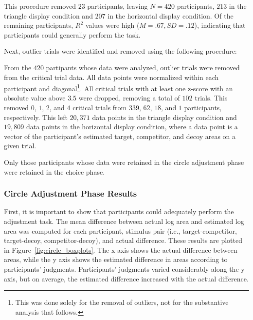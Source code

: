 This procedure removed $23$ participants, leaving $N=420$ participants, $213$ in the triangle display condition and $207$ in the horizontal display condition. Of the remaining participants, $R^2$ values were high ($M=.67,SD=.12$), indicating that participants could generally perform the task.

Next, outlier trials were identified and removed using the following procedure:

From the $420$ partipants whose data were analyzed, outlier trials were removed from the critical trial data. All data points were normalized within each participant and diagonal\footnote{This was done solely for the removal of outliers, not for the substantive analysis that follows.}. All critical trials with at least one z-score with an absolute value above $3.5$ were dropped, removing a total of $102$ trials. This removed $0$, $1$, $2$, and $4$ critical trials from $339$, $62$, $18$, and $1$ participants, respectively. This left $20,371$ data points in the triangle display condition and $19,809$ data points in the horizontal display condition, where a data point is a vector of the participant's estimated target, competitor, and decoy areas on a given trial. 

Only those participants whose data were retained in the circle adjustment phase were retained in the choice phase. 

\subsubsection{Circle Adjustment Phase Results}

First, it is important to show that participants could adequately perform the adjustment task. The mean difference between actual log area and estimated log area was computed for each participant, stimulus pair (i.e., target-competitor, target-decoy, competitor-decoy), and actual difference. These results are plotted in Figure~\ref{fig:circle_boxplots}. The x axis shows the actual difference between areas, while the y axis shows the estimated difference in areas according to participants' judgments. Participants' judgments varied considerably along the y axis, but on average, the estimated difference increased with the actual difference. 

